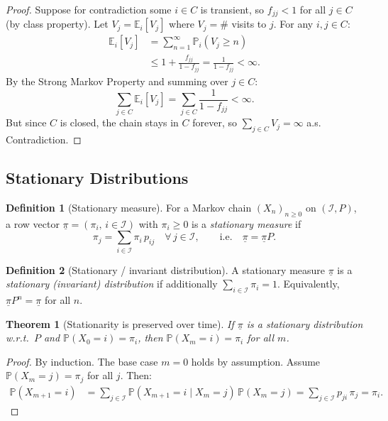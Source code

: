 \documentclass[12pt, a4paper]{article}
\theoremstyle{definition}
\newtheorem{definition}{Definition}[section]
\theoremstyle{plain}
\newtheorem{theorem}{Theorem}[section]
\newcommand{\PP}{\mathbb{P}}
\newcommand{\EE}{\mathbb{E}}
\newcommand{\II}{\mathcal{I}}
\begin{document}
\begin{proof}
Suppose for contradiction some $i \in C$ is transient, so $f_{jj} < 1$ for all $j \in C$ (by class property). Let $V_j = \EE_i[V_j]$ where $V_j = \#$ visits to $j$. For any $i, j \in C$:
\begin{align*}
  \EE_i[V_j] &= \sum_{n=1}^{\infty} \PP_i(V_j \ge n) \\
             &\le 1 + \frac{f_{jj}}{1-f_{jj}} = \frac{1}{1-f_{jj}} < \infty.
\end{align*}
By the Strong Markov Property and summing over $j \in C$:
\begin{equation*}
  \sum_{j \in C} \EE_i[V_j] = \sum_{j \in C} \frac{1}{1-f_{jj}} < \infty.
\end{equation*}
But since $C$ is closed, the chain stays in $C$ forever, so $\sum_{j \in C} V_j = \infty$ a.s. Contradiction.
\end{proof}

\subsection{Stationary Distributions}

\begin{definition}[Stationary measure]
For a Markov chain $(X_n)_{n \ge 0}$ on $(\II, P)$, a row vector $\underline{\pi} = (\pi_i,\, i \in \II)$ with $\pi_i \ge 0$ is a \emph{stationary measure} if
\begin{equation*}
  \pi_j = \sum_{i \in \II} \pi_i\, p_{ij} \quad \forall\, j \in \II, \qquad \text{i.e.}\quad \underline{\pi} = \underline{\pi} P.
\end{equation*}
\end{definition}

\begin{definition}[Stationary / invariant distribution]
A stationary measure $\underline{\pi}$ is a \emph{stationary (invariant) distribution} if additionally $\sum_{i \in \II} \pi_i = 1$. Equivalently, $\underline{\pi} P^n = \underline{\pi}$ for all $n$.
\end{definition}

\begin{theorem}[Stationarity is preserved over time]
If $\underline{\pi}$ is a stationary distribution w.r.t.\ $P$ and $\PP(X_0 = i) = \pi_i$, then $\PP(X_m = i) = \pi_i$ for all $m$.
\end{theorem}

\begin{proof}
By induction. The base case $m=0$ holds by assumption. Assume $\PP(X_m = j) = \pi_j$ for all $j$. Then:
\begin{align*}
  \PP(X_{m+1} = i) &= \sum_{j \in \II} \PP(X_{m+1}=i \mid X_m=j)\,\PP(X_m=j)
  = \sum_{j \in \II} p_{ji}\,\pi_j = \pi_i.
\end{align*}
\end{proof}
\end{document}
